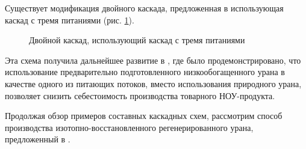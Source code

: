 Существует модификация двойного каскада, предложенная в \cite{smirnovDilutionRecycledUranium2015} использующая каскад с тремя питаниями  (рис. \ref{fig:double_3feeds}).
\begin{figure}[ht]
  \caption{Двойной каскад, использующий каскад с тремя питаниями}\label{fig:double_3feeds}
\end{figure}

Эта схема получила дальнейшее развитие в \cite{smirnovEvaluatingEffectivenessDilution2016}, где было продемонстрировано, что использование предварительно подготовленного низкообогащенного урана в качестве одного из питающих потоков, вместо использования природного урана, позволяет снизить себестоимость производства товарного НОУ-продукта.

Продолжая обзор примеров составных каскадных схем, рассмотрим способ производства изотопно-восстановленного регенерированного урана, предложенный в \cite{SposobIzotopnogoVosstanovleniyac}.

